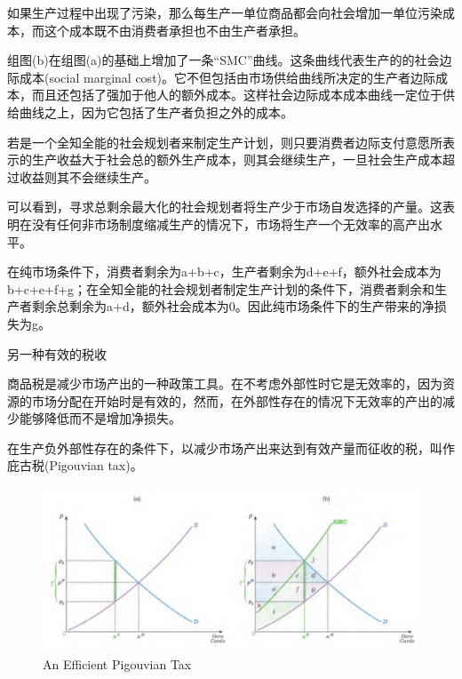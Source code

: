 \documentclass{article}
\begin{document}
如果生产过程中出现了污染，那么每生产一单位商品都会向社会增加一单位污染成本，而这个成本既不由消费者承担也不由生产者承担。

组图(b)在组图(a)的基础上增加了一条“SMC”曲线。这条曲线代表生产的的社会边际成本(social marginal cost)。它不但包括由市场供给曲线所决定的生产者边际成本，而且还包括了强加于他人的额外成本。这样社会边际成本成本曲线一定位于供给曲线之上，因为它包括了生产者负担之外的成本。

若是一个全知全能的社会规划者来制定生产计划，则只要消费者边际支付意愿所表示的生产收益大于社会总的额外生产成本，则其会继续生产，一旦社会生产成本超过收益则其不会继续生产。

可以看到，寻求总剩余最大化的社会规划者将生产少于市场自发选择的产量。这表明在没有任何非市场制度缩减生产的情况下，市场将生产一个无效率的高产出水平。

在纯市场条件下，消费者剩余为a+b+c，生产者剩余为d+e+f，额外社会成本为b+c+e+f+g；在全知全能的社会规划者制定生产计划的条件下，消费者剩余和生产者剩余总剩余为a+d，额外社会成本为0。因此纯市场条件下的生产带来的净损失为g。

\hspace*{\fill}

另一种有效的税收

商品税是减少市场产出的一种政策工具。在不考虑外部性时它是无效率的，因为资源的市场分配在开始时是有效的，然而，在外部性存在的情况下无效率的产出的减少能够降低而不是增加净损失。

在生产负外部性存在的条件下，以减少市场产出来达到有效产量而征收的税，叫作庇古税(Pigouvian tax)。

\begin{figure}[H] %
	\centering %
	\includegraphics[width=1\textwidth]{21_2} %
	\caption{An Efficient Pigouvian Tax} %
	\label{Fig.main3} %
\end{figure}
\end{document}
